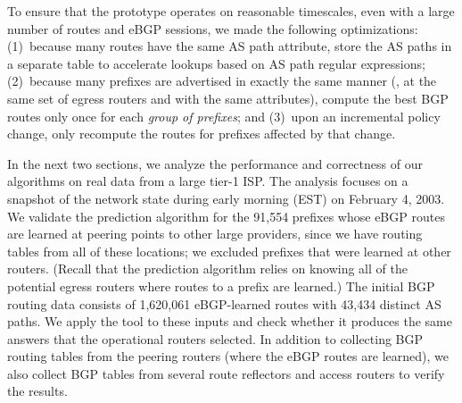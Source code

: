 To ensure that the prototype operates on reasonable timescales, even
with a large number of routes and eBGP sessions, we made the following
optimizations: 
(1)~because many routes have the same AS path attribute, store the AS paths
in a separate table to accelerate lookups based on AS path regular
expressions;  
(2)~because many prefixes are advertised in exactly the same manner (\ie, at
the same set of egress routers and with the same attributes), 
compute the best BGP routes only once for each {\em group of prefixes};
and (3)~upon an incremental policy change, only recompute the routes for
prefixes affected by that change.


In the next two sections, we analyze the performance and correctness of
our algorithms on real data from a large tier-1 ISP.  The analysis
focuses on a snapshot of the network state during early morning (EST) on
February 4, 2003.  We validate the prediction algorithm for the 91,554
prefixes whose eBGP routes are learned at peering points to other large
providers, since we have routing tables from all of these locations; we
excluded prefixes that were learned at other routers.  (Recall that the
prediction algorithm relies on knowing all of the potential egress
routers where routes to a prefix are learned.)  The initial BGP routing
data consists of 1,620,061 eBGP-learned routes with 43,434 distinct AS
paths.  We apply the tool to these inputs and check whether it
produces the same answers that the operational routers selected.  In
addition to collecting BGP routing tables from the peering routers
(where the eBGP routes are learned), we also collect BGP tables from
several route reflectors and access routers to verify the results.








